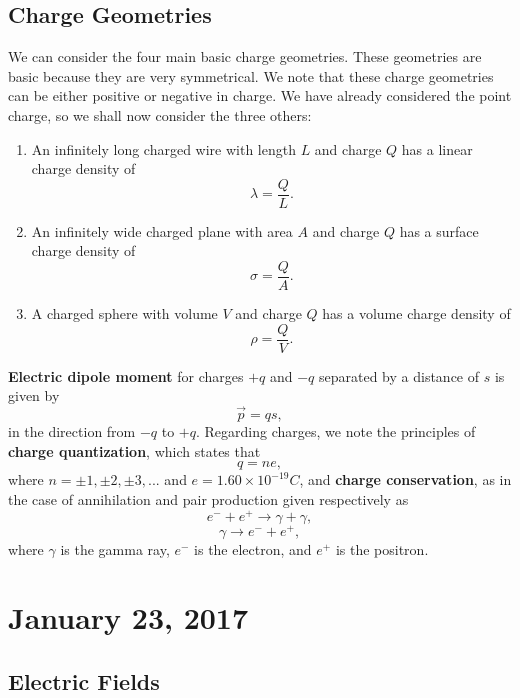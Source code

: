 \documentclass[11pt]{article}
\theoremstyle{plain} %
\theoremstyle{definition}
\theoremstyle{example}
\theoremstyle{remark}
\begin{document}
\subsection{Charge Geometries}

We can consider the four main basic charge geometries. These geometries are basic because they are very symmetrical. We note that these charge geometries can be either positive or negative in charge. We have already considered the point charge, so we shall now consider the three others:
\begin{enumerate}
	\item An infinitely long charged wire with length $L$ and charge $Q$ has a linear charge density of 
	$$\lambda = \frac{Q}{L}.$$
	\item An infinitely wide charged plane with area $A$ and charge $Q$ has a surface charge density of $$\sigma = \frac{Q}{A}.$$
	\item A charged sphere with volume $V$ and charge $Q$ has a volume charge density of $$\rho = \frac{Q}{V}.$$
\end{enumerate}

\textbf{Electric dipole moment} for charges $+q$ and $-q$ separated by a distance of $s$ is given by $$\vec{p} = qs,$$
in the direction from $-q$ to $+q$. Regarding charges, we note the principles of \textbf{charge quantization}, which states that 
$$q = ne,$$
where $n = \pm1, \pm2, \pm3, ...$ and $e = 1.60\times10^{-19}C$, and \textbf{charge conservation}, as in the case of annihilation and pair production given respectively as 
$$e^- + e^+ \rightarrow \gamma +\gamma,$$
$$\gamma \rightarrow e^- + e^+,$$
where $\gamma$ is the gamma ray, $e^-$ is the electron, and $e^+$ is the positron. 

\section{January 23, 2017}
\subsection{Electric Fields}
\end{document}
